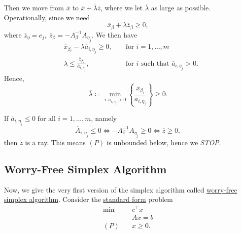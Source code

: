 \begin{enumerate}
	      Then we move from \(\overline{x}\) to \(\overline{x}+\overline{\lambda} \overline{z}\), where we let \(\overline{\lambda}\) as large as possible.
	      Operationally, since we need
	      \[
		      \overline{x}_{\beta} + \lambda \overline{z}_{\beta} \geq 0,
	      \]
	      where \(\overline{z}_{\eta} = e_{j},\ \overline{z}_{\beta} = -A^{-1}_{\beta}A_{\eta_{j}}\). We then have
	      \[
		      \begin{alignedat}{3}
			      &\overline{x}_{\beta_{i}} - \lambda \overline{a}_{i, \eta_{j}}\geq 0, &&\text{ for }i = 1, \ldots , m\\
			      & \lambda \leq \frac{\overline{x}_{\beta_{i}}}{\overline{a}_{i, \eta_{j}}}, &&\text{ for }i \text{ such that }\overline{a}_{i, \eta_j}>0.
		      \end{alignedat}
	      \]
	      Hence,
	      \[
		      \overline{\lambda} \coloneqq \min_{i: \overline{a}_{i, \eta_{j}}>0} \left\{ \frac{\overline{x}_{\beta_{i}}}{\overline{a}_{i, \eta_{j}}} \right\} \geq 0.
	      \]
	      \begin{remark}
		      If \(\overline{a}_{i, \eta_{j}}\leq 0\) for all \(i = 1, \ldots , m\), namely
		      \[
			      \overline{A}_{i, \eta_{j}}\leq 0 \iff -A^{-1}_{\beta}A_{\eta_{j}}\geq 0 \iff \overline{z}\geq 0,
		      \]
		      then \(\overline{z}\) is a ray. This means \((P)\) is unbounded below, hence we \emph{STOP}.
	      \end{remark}
\end{enumerate}

\subsection{Worry-Free Simplex Algorithm}
Now, we give the very first version of the simplex algorithm called \hyperref[algo:worry-free-simplex-algorithm]{worry-free simplex algorithm}.
Consider the \hyperref[def:standard-form]{standard form} problem
\[
	\begin{alignedat}{5}
		\min~&c^{\top}x\\
		&Ax = b \\
		(P)\quad&x\geq  0.
	\end{alignedat}
\]

